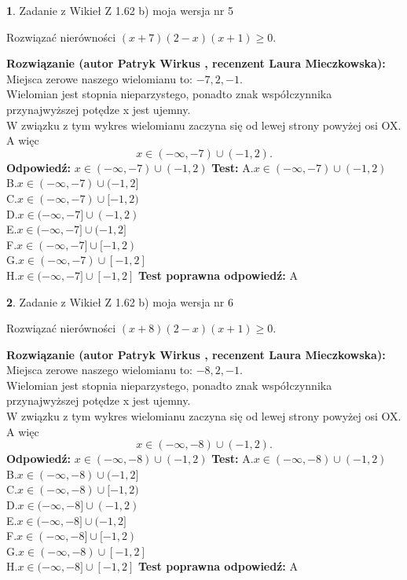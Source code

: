 \documentclass[12pt, a4paper]{article}
\theoremstyle{definition} %
\newtheorem{zad}{}
\newcommand{\zadStart}[1]{\begin{zad}#1\newline}
\newcommand{\zadStop}{\end{zad}}
\newcommand{\rozwStart}[2]{\noindent \textbf{Rozwiązanie (autor #1 , recenzent #2): }\newline}
\newcommand{\rozwStop}{\newline}
\newcommand{\odpStart}{\noindent \textbf{Odpowiedź:}\newline}
\newcommand{\odpStop}{\newline}
\newcommand{\testStart}{\noindent \textbf{Test:}\newline}
\newcommand{\testStop}{\newline}
\newcommand{\kluczStart}{\noindent \textbf{Test poprawna odpowiedź:}\newline}
\newcommand{\kluczStop}{\newline}
\begin{document}
\zadStart{Zadanie z Wikieł Z 1.62 b) moja wersja nr 5}

Rozwiązać nierówności $(x+7)(2-x)(x+1)\ge0$.
\zadStop
\rozwStart{Patryk Wirkus}{Laura Mieczkowska}
Miejsca zerowe naszego wielomianu to: $-7, 2, -1$.\\
Wielomian jest stopnia nieparzystego, ponadto znak współczynnika przy\linebreak najwyższej potędze x jest ujemny.\\ W związku z tym wykres wielomianu zaczyna się od lewej strony powyżej osi OX. A więc $$x \in (-\infty,-7) \cup (-1,2).$$
\rozwStop
\odpStart
$x \in (-\infty,-7) \cup (-1,2)$
\odpStop
\testStart
A.$x \in (-\infty,-7) \cup (-1,2)$\\
B.$x \in (-\infty,-7) \cup (-1,2]$\\
C.$x \in (-\infty,-7) \cup [-1,2)$\\
D.$x \in (-\infty,-7] \cup (-1,2)$\\
E.$x \in (-\infty,-7] \cup (-1,2]$\\
F.$x \in (-\infty,-7] \cup [-1,2)$\\
G.$x \in (-\infty,-7) \cup [-1,2]$\\
H.$x \in (-\infty,-7] \cup [-1,2]$
\testStop
\kluczStart
A
\kluczStop



\zadStart{Zadanie z Wikieł Z 1.62 b) moja wersja nr 6}

Rozwiązać nierówności $(x+8)(2-x)(x+1)\ge0$.
\zadStop
\rozwStart{Patryk Wirkus}{Laura Mieczkowska}
Miejsca zerowe naszego wielomianu to: $-8, 2, -1$.\\
Wielomian jest stopnia nieparzystego, ponadto znak współczynnika przy\linebreak najwyższej potędze x jest ujemny.\\ W związku z tym wykres wielomianu zaczyna się od lewej strony powyżej osi OX. A więc $$x \in (-\infty,-8) \cup (-1,2).$$
\rozwStop
\odpStart
$x \in (-\infty,-8) \cup (-1,2)$
\odpStop
\testStart
A.$x \in (-\infty,-8) \cup (-1,2)$\\
B.$x \in (-\infty,-8) \cup (-1,2]$\\
C.$x \in (-\infty,-8) \cup [-1,2)$\\
D.$x \in (-\infty,-8] \cup (-1,2)$\\
E.$x \in (-\infty,-8] \cup (-1,2]$\\
F.$x \in (-\infty,-8] \cup [-1,2)$\\
G.$x \in (-\infty,-8) \cup [-1,2]$\\
H.$x \in (-\infty,-8] \cup [-1,2]$
\testStop
\kluczStart
A
\kluczStop
\end{document}

